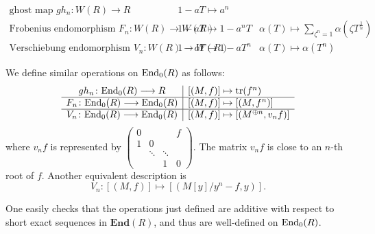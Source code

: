 \begin{equation*}
	\begin{array}{c|l|c}
	\mbox{ghost map } gh_n\colon W(R)\longrightarrow R & 1-aT \mapsto a^n & \\
	\hline
	\mbox{Frobenius endomorphism } F_n \colon W(R)\longrightarrow W(R)&  1-aT\mapsto 1-a^nT & \alpha(T)\mapsto \sum_{\zeta^n=1}\alpha(\zeta T^{\frac{1}{n}}) \\
	\hline
	\mbox{Verschiebung endomorphism }V_n \colon W(R)\longrightarrow W(R) &1-aT\mapsto 1-aT^n&\alpha(T)\mapsto \alpha(T^n)
\end{array}
\end{equation*}

We define similar operations on $\mathrm{End}_0(R)$ as follows:
\begin{equation*}
	\begin{array}{c|l}
	 gh_n\colon \mathrm{End}_0(R) \longrightarrow R & [(M,f)] \mapsto \mathrm{tr}(f^n)  \\
	\hline
	 F_n \colon \mathrm{End}_0(R) \longrightarrow \mathrm{End}_0(R) &  [(M,f)]\mapsto [(M,f^n)]  \\
	\hline
	V_n \colon \mathrm{End}_0(R) \longrightarrow \mathrm{End}_0(R)  &[(M,f)]\mapsto [(M^{\oplus n},v_nf)]
\end{array}
\end{equation*}
where $v_nf$ is represented by $\begin{pmatrix}
	0& &  &f\\1&0 & &\\ &\ddots&\ddots&\\ & &1&0
\end{pmatrix}$. The matrix $v_nf$ is close to an $n$-th root of $f$. Another equivalent description is
\[V_n\colon [(M,f)] \mapsto [(M[y]/y^n-f,y)].\]

One easily checks that the operations just defined are additive with respect to short exact sequences in $\mathbf{End}(R)$, and thus are well-defined on $\mathrm{End}_0(R)$.

